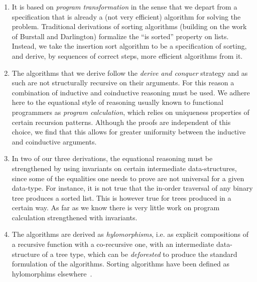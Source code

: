 \documentclass[a4paper,11pt]{llncs}
\begin{document}
\begin{enumerate}

\item It is based on \emph{program transformation} in the sense that
  we depart from a specification that is already a (not very
  efficient) algorithm for solving the problem. Traditional
  derivations of sorting algorithms (building on the work of Burstall
  and Darlington) formalize the ``is sorted'' property on
  lists. Instead, we take the insertion sort algorithm to be a
  specification of sorting, and derive, by sequences of correct steps,
  more efficient algorithms from it.

\item The algorithms that we derive follow the \emph{derive and
    conquer} strategy and as such are not structurally recursive on
  their arguments. For this reason a combination of inductive and
  coinductive reasoning must be used. We adhere here to the equational
  style of reasoning usually known to functional programmers as
  \emph{program calculation}, which relies on uniqueness properties of
  certain recursion patterns. Although the proofs are independent of
  this choice, we find that this allows for greater uniformity between
  the inductive and coinductive arguments.

\item In two of our three derivations, the equational reasoning must
  be strengthened by using invariants on certain intermediate
  data-structures, since some of the equalities one needs to prove are
  not universal for a given data-type. For instance, it is not true
  that the in-order traversal of any binary tree produces a sorted
  list. This is however true for trees produced in a certain way. As
  far as we know there is very little work on program calculation
  strengthened with invariants.

\item The algorithms are derived as \emph{hylomorphisms}, i.e. as
  explicit compositions of a recursive function with a co-recursive
  one, with an intermediate data-structure of a tree type, which can
  be \emph{deforested} to produce the standard formulation of the
  algorithms. Sorting algorithms have been defined as hylomorphims
  elsewhere~\cite{AugusteijnL:sorm}.

\end{enumerate}
\end{document}
